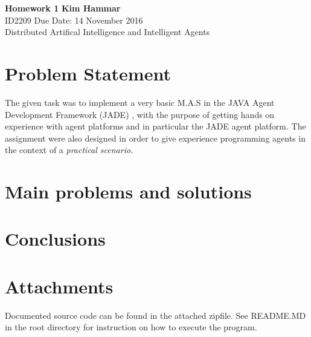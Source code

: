 \documentclass[a4paper, 11pt]{article}
\begin{document}
\noindent
\large\textbf{Homework 1} \hfill \textbf{Kim Hammar} \\
\normalsize ID2209 \hfill Due Date: 14 November 2016 \\
Distributed Artifical Intelligence and Intelligent Agents \hfill \\

\section*{Problem Statement}
The given task was to implement a very basic M.A.S in the JAVA Agent Development Framework (JADE) \citep{jade}, with the purpose of getting hands on experience with agent platforms and in particular the JADE agent platform. The assignment were also designed in order  to give experience programming agents in the context of a \textit{practical scenario}.

\section*{Main problems and solutions}
\lipsum[2]

\section*{Conclusions}
\lipsum[3]

\section*{Attachments}
Documented source code can be found in the attached zipfile. See README.MD in the root directory for instruction on how to execute the program.

{}

\end{document}
